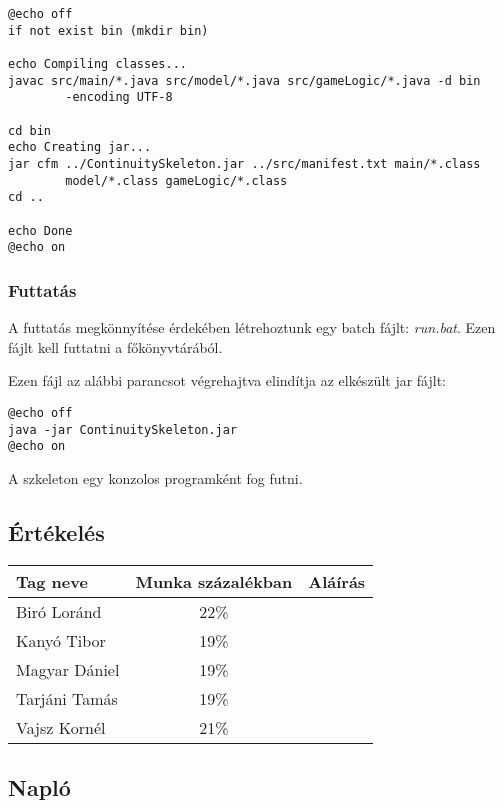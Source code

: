 \begin{verbatim}
@echo off
if not exist bin (mkdir bin)

echo Compiling classes...
javac src/main/*.java src/model/*.java src/gameLogic/*.java -d bin
        -encoding UTF-8

cd bin
echo Creating jar...
jar cfm ../ContinuitySkeleton.jar ../src/manifest.txt main/*.class
        model/*.class gameLogic/*.class
cd ..

echo Done
@echo on
\end{verbatim}

\subsubsection{Futtatás}

A futtatás megkönnyítése érdekében létrehoztunk egy batch fájlt: \emph{run.bat}. Ezen fájlt kell futtatni a főkönyvtárából.

Ezen fájl az alábbi parancsot végrehajtva elindítja az elkészült jar fájlt: 
\begin{verbatim}
@echo off
java -jar ContinuitySkeleton.jar
@echo on
\end{verbatim}

A szkeleton egy konzolos programként fog futni.

\subsection{Értékelés}
\begin{tabular}{|p{130pt}|c|p{150pt}|}
\hline 
\textbf{Tag neve} & \textbf{Munka százalékban} & \textbf{Aláírás}\\ 
\hline 
Biró Loránd & 22\% & \\ 
\hline 
Kanyó Tibor & 19\% & \\
\hline 
Magyar Dániel & 19\% & \\
\hline 
Tarjáni Tamás & 19\% & \\
\hline 
Vajsz Kornél & 21\% & \\
\hline 
\end{tabular} 

\newpage

\subsection{Napló}

\begin{journal}


\end{journal}

